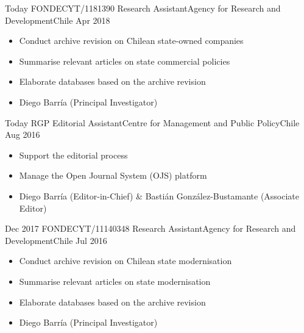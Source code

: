 






\begin{experiences}
  \emptySeparator 
  \experience 
    {Today} {FONDECYT/1181390 Research Assistant}{Agency for Research and Development}{Chile} {Apr 2018}
    {\begin{itemize}
    \item Conduct archive revision on Chilean state-owned companies
    \item Summarise relevant articles on state commercial policies
    \item Elaborate databases based on the archive revision
    \item Diego Barría {\small (Principal Investigator)}
    \end{itemize}}
    {}
\end{experiences}
\vspace{-2mm}

\begin{experiences}
  \experience
    {Today} {RGP Editorial Assistant}{Centre for Management and Public Policy}{Chile} {Aug 2016}
    {\begin{itemize}
    \item Support the editorial process
    \item Manage the Open Journal System (OJS) platform 
    \item Diego Barría {\small (Editor-in-Chief)} \& Bastián González-Bustamante {\small (Associate Editor)}
    \end{itemize}}
    {}
\end{experiences}
\vspace{-2mm}

\begin{experiences}
  \emptySeparator 
  \experience 
    {Dec 2017} {FONDECYT/11140348 Research Assistant}{Agency for Research and Development}{Chile} {Jul 2016}
    {\begin{itemize}
    \item Conduct archive revision on Chilean state modernisation
    \item Summarise relevant articles on state modernisation
    \item Elaborate databases based on the archive revision
    \item Diego Barría {\small (Principal Investigator)}
    \end{itemize}}
    {}
\end{experiences}
\vspace{-2mm}

